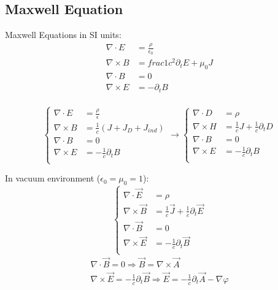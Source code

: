 \subsection{Maxwell Equation}

Maxwell Equations in SI units:
\begin{equation}
    \label{eqn:Maxwell_SI}
    \begin{aligned}
	\nabla\cdot{E} &= \frac{\rho}{\epsilon_0}	\\
	\nabla\times{B} &= frac{1}{c^2}\partial_{t}E + \mu_0 J	\\
	\nabla\cdot{B} &= 0  \\
	\nabla\times{E} &= -\partial_{t}B	\\
    \end{aligned}
\end{equation}




\begin{equation}
    \label{eqn:Maxwell}
    \left\{
    \begin{aligned}
	\nabla\cdot{E} &= \frac{\rho}{\epsilon}	\\
	\nabla\times{B} &= \frac{1}{c}\left(J + J_D + J_{ind}\right)	\\
	\nabla\cdot{B} &= 0  \\
	\nabla\times{E} &= -\frac{1}{c}\partial_{t}B	\\
    \end{aligned}
    \right.
    \longrightarrow
    \left\{
    \begin{aligned}
	\nabla\cdot{D} &= \rho	\\
	\nabla\times{H} &= \frac{1}{c}J +\frac{1}{c}\partial_{t}D    \\
	\nabla\cdot{B} &= 0  \\
	\nabla\times{E} &= -\frac{1}{c}\partial_{t}B	\\
    \end{aligned}
    \right.
\end{equation}

In vacuum environment ($\epsilon_0 = \mu_0  = 1$):
\begin{equation}
    \label{eqn:Maxwell_vacuum}
    \left\{
    \begin{aligned}
	\nabla\cdot{\vec{E}} &= \rho	\\
	\nabla\times{\vec{B}} &= \frac{1}{c}\vec{J} +\frac{1}{c}\partial_{t}\vec{E}    \\
	\nabla\cdot{\vec{B}} &= 0  \\
	\nabla\times{\vec{E}} &= -\frac{1}{c}\partial_{t}\vec{B}	\\
    \end{aligned}
    \right.
\end{equation}
\begin{equation*}
    \begin{gathered}
	\nabla\cdot\vec{B} = 0 \Rightarrow \vec{B} = \nabla\times\vec{A}    \\
	\nabla\times\vec{E} = -\frac{1}{c}\partial_t\vec{B} \Rightarrow \vec{E} = -\frac{1}{c}\partial_t\vec{A} - \nabla\varphi
    \end{gathered}
\end{equation*}

